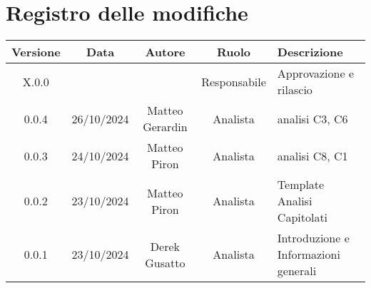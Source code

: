 
\section*{Registro delle modifiche}
\begin{table}[H]
    \begin{tabular}{|c|c|c|c|p{3cm}|}
        \hline
         \textbf{Versione} &  \textbf{Data} &  \textbf{Autore} &  \textbf{Ruolo} & \textbf{Descrizione} \\
          \hline
          X.0.0 &  &  & Responsabile & Approvazione e rilascio\\
            
          \hline
          0.0.4 & 26/10/2024 & Matteo Gerardin & Analista & analisi C3, C6 \\
          \hline
          0.0.3 & 24/10/2024 & Matteo Piron & Analista & analisi C8, C1 \\
        \hline
          0.0.2 & 23/10/2024 & Matteo Piron & Analista & Template Analisi Capitolati \\
          \hline
          0.0.1 & 23/10/2024 & Derek Gusatto & Analista & Introduzione e Informazioni generali \\
          
          \hline
    \end{tabular}
\end{table}